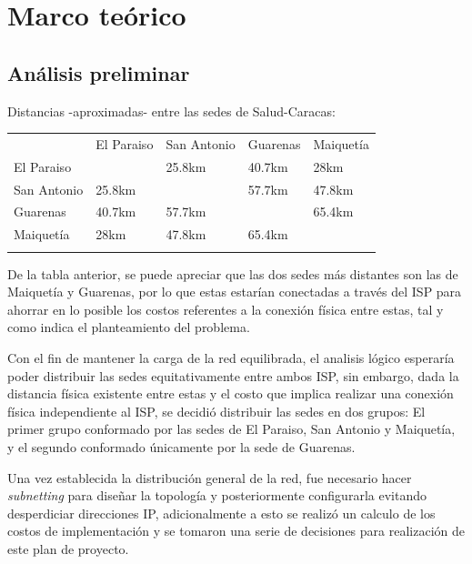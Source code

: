 \documentclass[]{article}
\begin{document}
{
\hypersetup{linkcolor=black}
\setcounter{tocdepth}{3}
\tableofcontents
}
\newpage

\section{Marco teórico}\label{marco-teuxf3rico}

\subsection{Análisis preliminar}\label{anuxe1lisis-preliminar}

Distancias -aproximadas- entre las sedes de Salud-Caracas:

\begin{longtable}[c]{@{}lllll@{}}
\toprule\addlinespace
& El Paraiso & San Antonio & Guarenas & Maiquetía
\\\addlinespace
\midrule\endhead
El Paraiso & & 25.8km & 40.7km & 28km
\\\addlinespace
San Antonio & 25.8km & & 57.7km & 47.8km
\\\addlinespace
Guarenas & 40.7km & 57.7km & & 65.4km
\\\addlinespace
Maiquetía & 28km & 47.8km & 65.4km &
\\\addlinespace
\bottomrule
\end{longtable}

De la tabla anterior, se puede apreciar que las dos sedes más distantes
son las de Maiquetía y Guarenas, por lo que estas estarían conectadas a
través del ISP para ahorrar en lo posible los costos referentes a la
conexión física entre estas, tal y como indica el planteamiento del
problema.

Con el fin de mantener la carga de la red equilibrada, el analisis
lógico esperaría poder distribuir las sedes equitativamente entre ambos
ISP, sin embargo, dada la distancia física existente entre estas y el
costo que implica realizar una conexión física independiente al ISP, se
decidió distribuir las sedes en dos grupos: El primer grupo conformado
por las sedes de El Paraiso, San Antonio y Maiquetía, y el segundo
conformado únicamente por la sede de Guarenas.

Una vez establecida la distribución general de la red, fue necesario
hacer \emph{subnetting} para diseñar la topología y posteriormente
configurarla evitando desperdiciar direcciones IP, adicionalmente a esto
se realizó un calculo de los costos de implementación y se tomaron una
serie de decisiones para realización de este plan de proyecto.
\end{document}
